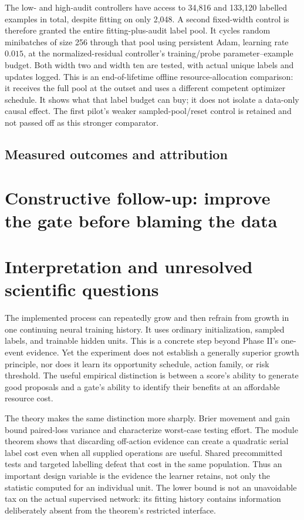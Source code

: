 \documentclass[11pt]{article}
\theoremstyle{remark}\newtheorem{remark}[theorem]{Remark}
\begin{document}
The low- and high-audit controllers have access to 34,816 and 133,120 labelled
examples in total, despite fitting on only 2,048. A second fixed-width control
is therefore granted the entire fitting-plus-audit label pool. It cycles
random minibatches of size 256 through that pool using persistent Adam,
learning rate $0.015$, at the normalized-residual controller's training/probe
parameter--example budget. Both width two and width ten are tested, with
actual unique labels and updates logged. This is an end-of-lifetime offline
resource-allocation comparison: it receives the full pool at the outset and
uses a different competent optimizer schedule. It shows what that label
budget can buy; it does not isolate a data-only causal effect. The first
pilot's weaker sampled-pool/reset control is retained and not passed off as
this stronger comparator.

\subsection{Measured outcomes and attribution}


\section{Constructive follow-up: improve the gate before blaming the data}



\section{Interpretation and unresolved scientific questions}
\label{sec:limits}
The implemented process can repeatedly grow and then refrain from growth in
one continuing neural training history. It uses ordinary initialization,
sampled labels, and trainable hidden units. This is a concrete step beyond
Phase II's one-event evidence. Yet the experiment does not establish a
generally superior growth principle, nor does it learn its opportunity
schedule, action family, or risk threshold. The useful empirical distinction
is between a score's ability to generate good proposals and a gate's ability
to identify their benefits at an affordable resource cost.

The theory makes the same distinction more sharply. Brier movement and
gain bound paired-loss variance and characterize worst-case testing effort. The
module theorem shows that discarding off-action evidence can create a
quadratic serial label cost even when all supplied operations are useful.
Shared precommitted tests and targeted labelling defeat that cost in the
same population. Thus an important design variable is the evidence the
learner retains, not only the statistic computed for an individual unit.
The lower bound is not an unavoidable tax on the actual supervised network:
its fitting history contains information deliberately absent from the
theorem's restricted interface.
\end{document}
